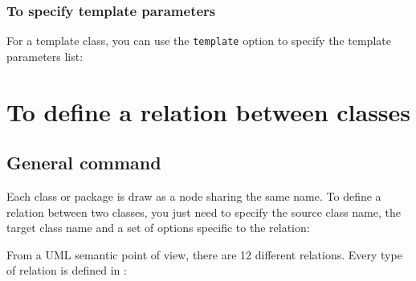 \documentclass[a4paper,11pt]{report}
\begin{document}
\subsubsection{To specify template parameters}\label{ss.classtemplate}

For a template class, you can use the {\tt template} option to specify the template parameters list:

\medskip

\begin{minipage}{0.5\textwidth}
	
\end{minipage}
\begin{minipage}{0.4\textwidth}
	\begin{center}
	\end{center}
\end{minipage}

\section{To define a relation between classes}\label{s.rel}

\subsection{General command}\label{ss.relgen}

Each class or package is draw as a node sharing the same name. To define a relation
between two classes, you just need to specify the source class name, the target class name and a set of options specific to the relation:

\medskip

\begin{minipage}{0.5\textwidth}
	
\end{minipage}
\begin{minipage}{0.4\textwidth}
	\begin{center}
	\end{center}
\end{minipage}

From a UML semantic point of view, there are 12 different relations. Every type of relation is defined in \tuml:
\end{document}
